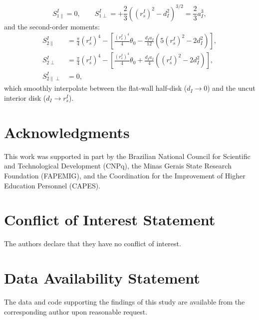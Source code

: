 \documentclass[VANCOUVER,Times1COL]{WileyNJD-v5}
\begin{document}
\begin{enumerate}
          \begin{equation}
              S_{1\parallel}^I = 0, \qquad S_{1\perp}^I = +\frac{2}{3} \left((r_s^I)^2 - d_I^2\right)^{3/2} = \frac{2}{3} a_I^3,
          \end{equation}
          and the second-order moments:
          \begin{align}
              S_{2\parallel}^I      & = \frac{\pi}{4}(r_s^I)^4 - \left[ \frac{(r_s^I)^4}{4}\theta_0 - \frac{d_I a_I}{12}\left(5(r_s^I)^2 - 2d_I^2\right) \right], \\
              S_{2\perp}^I          & = \frac{\pi}{4}(r_s^I)^4 - \left[ \frac{(r_s^I)^4}{4}\theta_0 + \frac{d_I a_I}{4}\left((r_s^I)^2 - 2d_I^2\right) \right],  \\
              S_{2\parallel\perp}^I & = 0,
          \end{align}
          which smoothly interpolate between the flat-wall half-disk ($d_I \to 0$) and the uncut interior disk ($d_I \to r_s^I$).
\end{enumerate}

\section*{Acknowledgments}
This work was supported in part by the Brazilian National Council for Scientific and Technological Development (CNPq), the Minas Gerais State Research Foundation (FAPEMIG), and the Coordination for the Improvement of Higher Education Personnel (CAPES).

\section*{Conflict of Interest Statement}
The authors declare that they have no conflict of interest.

\section*{Data Availability Statement}
The data and code supporting the findings of this study are available from the corresponding author upon reasonable request.


\end{document}
